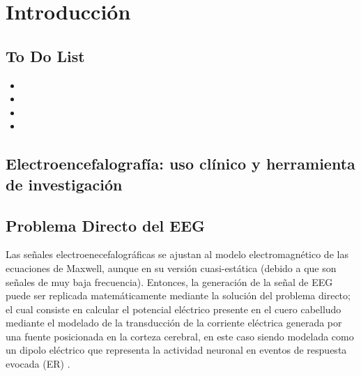 %
\chapter{Introducción}
\label{sec:intro}







\section{To Do List}

\begin{itemize}
	\item {}
	\item {}
	\item {}
	\item {}
\end{itemize}


\section{Electroencefalografía: uso clínico y herramienta de investigación}

\section{Problema Directo del EEG}
\label{sec:methodology:direct}

Las señales electroenecefalográficas se ajustan al modelo electromagnético de las ecuaciones de Maxwell, aunque en su versión cuasi-estática
(debido a que son señales de muy baja frecuencia). Entonces, la generación de la señal de EEG puede ser replicada matemáticamente mediante la
solución del problema directo; el cual consiste en calcular el potencial eléctrico presente en el cuero cabelludo mediante el modelado de la transducción de la corriente eléctrica generada por una fuente posicionada en la corteza cerebral, en este caso siendo modelada como un dipolo eléctrico que representa la actividad neuronal en eventos de respuesta evocada (ER) \cite{Mosher1999, Hallez2007}. 

